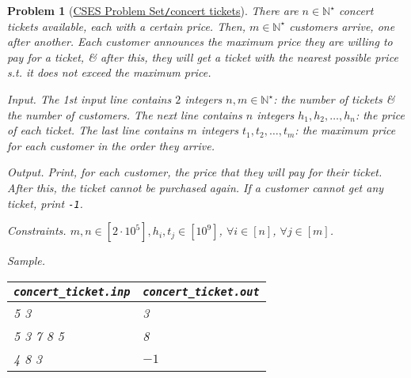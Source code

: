 \documentclass{article}
\newtheorem{problem}{Problem}
\begin{document}
\begin{problem}[\href{https://cses.fi/problemset/task/1091}{CSES Problem Set{\tt/}concert tickets}]
    There are $n\in\mathbb{N}^\star$ concert tickets available, each with a certain price. Then, $m\in\mathbb{N}^\star$ customers arrive, one after another. Each customer announces the maximum price they are willing to pay for a ticket, \& after this, they will get a ticket with the nearest possible price s.t. it does not exceed the maximum price.
    \item {\sf Input.} The 1st input line contains $2$ integers $n,m\in\mathbb{N}^\star$: the number of tickets \& the number of customers. The next line contains $n$ integers $h_1,h_2,\ldots,h_n$: the price of each ticket. The last line contains $m$ integers $t_1,t_2,\ldots,t_m$: the maximum price for each customer in the order they arrive.
    \item {\sf Output.} Print, for each customer, the price that they will pay for their ticket. After this, the ticket cannot be purchased again. If a customer cannot get any ticket, print {\tt-1}.
    \item {\sf Constraints.} $m,n\in[2\cdot10^5],h_i,t_j\in[10^9]$, $\forall i\in[n]$, $\forall j\in[m]$.
    \item {\sf Sample.}
    \begin{table}[H]
        \centering
        \begin{tabular}{|l|l|}
            \hline
            \verb|concert_ticket.inp| & \verb|concert_ticket.out| \\
            \hline
            5 3 & 3 \\
            5 3 7 8 5 & 8 \\
            4 8 3 & $-1$ \\
            \hline
        \end{tabular}
    \end{table}
\end{problem}
\end{document}
